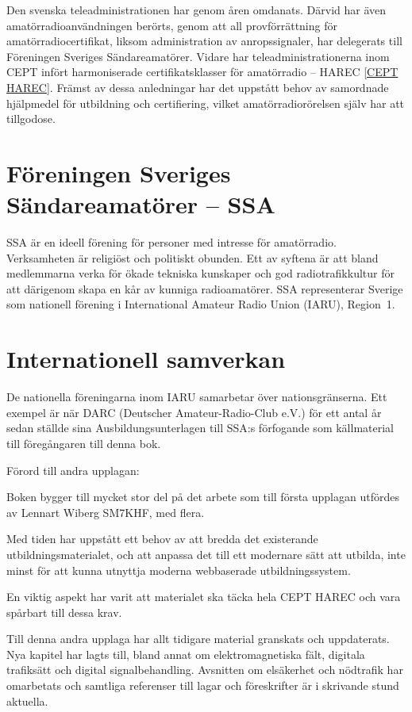 Den svenska teleadministrationen har genom åren omdanats. Därvid har även
amatörradioanvändningen berörts, genom att all provförrättning för
amatörradiocertifikat, liksom administration av anropssignaler, har delegerats till Föreningen Sveriges Sändareamatörer. Vidare har teleadministrationerna inom CEPT infört
harmoniserade certifikatsklasser för amatörradio -- HAREC \ref{CEPT HAREC}. Främst av dessa anledningar har det uppstått behov av samordnade hjälpmedel för utbildning och certifiering, vilket amatörradiorörelsen själv har att tillgodose.

\section*{Föreningen Sveriges Sändareamatörer -- SSA}

SSA är en ideell förening för personer med intresse för amatörradio.
Verksamheten är religiöst och politiskt obunden. Ett av syftena är att bland
medlemmarna verka för ökade tekniska kunskaper och god radiotrafikkultur för att
därigenom skapa en kår av kunniga radioamatörer. SSA representerar Sverige som
nationell förening i International Amateur Radio Union (IARU), Region~1.

\section*{Internationell samverkan}

De nationella föreningarna inom IARU samarbetar över nationsgränserna. Ett
exempel är när DARC (Deutscher Amateur-Radio-Club e.V.) för ett antal år sedan
ställde sina Ausbildungsunterlagen till SSA:s förfogande som källmaterial till föregångaren till denna bok.


\clearpage

Förord till andra upplagan:


Boken bygger till mycket stor del på det arbete som till första upplagan utfördes av Lennart Wiberg SM7KHF, med flera.

Med tiden har uppstått ett behov av att bredda det existerande utbildningsmaterialet, och att anpassa det till ett modernare sätt att utbilda, inte minst för att kunna utnyttja moderna webbaserade utbildningssystem.

En viktig aspekt har varit att materialet ska täcka hela CEPT HAREC och vara spårbart till dessa krav.

Till denna andra upplaga har allt tidigare material granskats och uppdaterats. Nya kapitel har lagts till, bland annat om elektromagnetiska fält, digitala trafiksätt och digital signalbehandling. Avsnitten om elsäkerhet och nödtrafik har omarbetats och samtliga referenser till lagar och föreskrifter är i skrivande stund aktuella.

